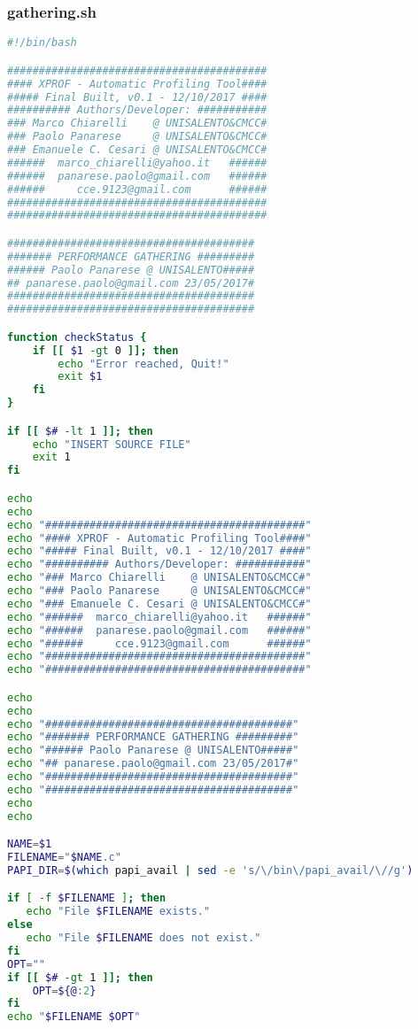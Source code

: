 \subsubsection{gathering.sh}
\begin{lstlisting}[language=bash,breaklines=true]
#!/bin/bash

#########################################
#### XPROF - Automatic Profiling Tool####
##### Final Built, v0.1 - 12/10/2017 ####
########## Authors/Developer: ###########
### Marco Chiarelli    @ UNISALENTO&CMCC#
### Paolo Panarese     @ UNISALENTO&CMCC#
### Emanuele C. Cesari @ UNISALENTO&CMCC#
######  marco_chiarelli@yahoo.it   ######
######  panarese.paolo@gmail.com   ######
######     cce.9123@gmail.com      ######
#########################################
#########################################

#######################################
####### PERFORMANCE GATHERING #########
###### Paolo Panarese @ UNISALENTO#####
## panarese.paolo@gmail.com 23/05/2017#
#######################################
#######################################

function checkStatus {
	if [[ $1 -gt 0 ]]; then
		echo "Error reached, Quit!"
		exit $1
	fi
}

if [[ $# -lt 1 ]]; then
	echo "INSERT SOURCE FILE"
	exit 1
fi

echo
echo
echo "#########################################"
echo "#### XPROF - Automatic Profiling Tool####"
echo "##### Final Built, v0.1 - 12/10/2017 ####"
echo "########## Authors/Developer: ###########"
echo "### Marco Chiarelli    @ UNISALENTO&CMCC#"
echo "### Paolo Panarese     @ UNISALENTO&CMCC#"
echo "### Emanuele C. Cesari @ UNISALENTO&CMCC#"
echo "######  marco_chiarelli@yahoo.it   ######"
echo "######  panarese.paolo@gmail.com   ######"
echo "######     cce.9123@gmail.com      ######"
echo "#########################################"
echo "#########################################"

echo
echo
echo "#######################################"
echo "####### PERFORMANCE GATHERING #########"
echo "###### Paolo Panarese @ UNISALENTO#####"
echo "## panarese.paolo@gmail.com 23/05/2017#"
echo "#######################################"
echo "#######################################"
echo
echo

NAME=$1
FILENAME="$NAME.c"
PAPI_DIR=$(which papi_avail | sed -e 's/\/bin\/papi_avail/\//g')

if [ -f $FILENAME ]; then
   echo "File $FILENAME exists."
else
   echo "File $FILENAME does not exist."
fi
OPT=""
if [[ $# -gt 1 ]]; then
	OPT=${@:2}
fi
echo "$FILENAME $OPT"


\end{lstlisting}
